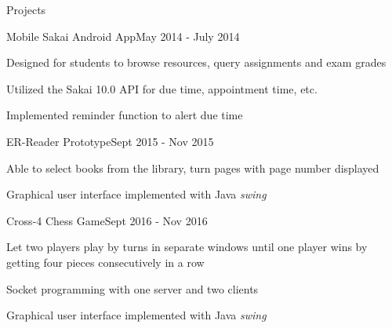 \documentclass{resume} %
\begin{document}
\begin{rSection}{Projects}

	\begin{rSubsection}{Mobile Sakai Android App}{May 2014  - July 2014}{}{}
	\item Designed for students to browse resources, query assignments and exam grades
	\item Utilized the Sakai 10.0 API for due time, appointment time, etc.
	\item Implemented reminder function to alert due time
	\end{rSubsection}
	
	\begin{rSubsection}{ER-Reader Prototype}{Sept 2015 - Nov 2015}{}{}
		\item Able to select books from the library, turn pages with page number displayed
		\item Graphical user interface implemented with Java \textit{swing}
	\end{rSubsection}
	
	\begin{rSubsection}{Cross-4 Chess Game}{Sept 2016 - Nov 2016}{}{}
		\item Let two players play by turns in separate windows until one player wins by getting four pieces consecutively in a row 
		\item Socket programming with one server and two clients
		\item Graphical user interface implemented with Java \textit{swing}		
	\end{rSubsection}

\end{rSection}
\end{document}
